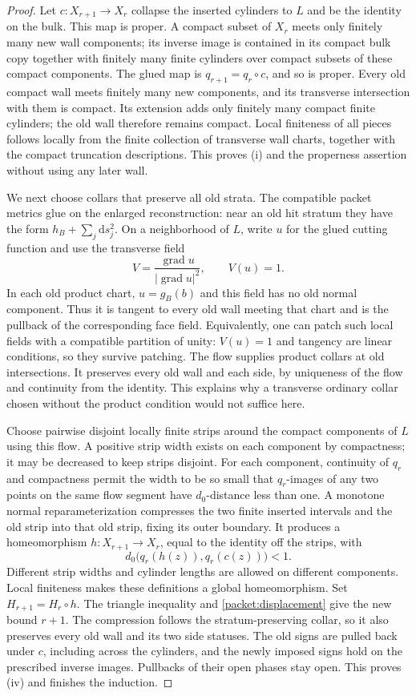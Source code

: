 \documentclass[11pt]{article}
\numberwithin{equation}{section}
\theoremstyle{definition}
\theoremstyle{remark}
\begin{document}
\begin{proof}
Let $c:X_{r+1}\to X_r$ collapse the inserted cylinders to $L$ and be
the identity on the bulk.  This map is proper.  A compact subset of
$X_r$ meets only finitely many new wall components; its inverse image
is contained in its compact bulk copy together with finitely many
finite cylinders over compact subsets of these compact components.
The glued map is $q_{r+1}=q_r\circ c$, and so is proper.
Every old compact wall meets finitely many new components, and its
transverse intersection with them is compact.  Its extension adds
only finitely many compact finite cylinders; the old wall therefore
remains compact.  Local finiteness of all pieces follows locally
from the finite collection of transverse wall charts, together with
the compact truncation descriptions.  This proves (i) and the
properness assertion without using any later wall.

We next choose collars that preserve all old strata.  The compatible
packet metrics glue on the enlarged reconstruction: near an old hit
stratum they have the form $h_B+\sum_j\mathrm d s_j^2$.  On a neighborhood
of $L$, write $u$ for the glued cutting function and use the transverse
field
\[
 V=\frac{\operatorname{grad} u}{|\operatorname{grad} u|^2},\qquad V(u)=1.
\]
In each old product chart, $u=g_B(b)$ and this field has no old normal
component.  Thus it is tangent to every old wall meeting that chart
and is the pullback of the corresponding face field.  Equivalently,
one can patch such local fields with a compatible partition of unity:
$V(u)=1$ and tangency are linear conditions, so they survive patching.
The flow supplies product collars at old intersections.  It preserves
every old wall and each side, by uniqueness of the flow and continuity
from the identity.  This explains why a transverse ordinary collar
chosen without the product condition would not suffice here.

Choose pairwise disjoint locally finite strips around the compact
components of $L$ using this flow.  A positive strip width exists on
each component by compactness; it may be decreased to keep strips
disjoint.  For each component, continuity of $q_r$ and compactness
permit the width to be so small that $q_r$-images of any two points
on the same flow segment have $d_0$-distance less than one.  A monotone normal
reparameterization compresses the two finite inserted intervals and
the old strip into that old strip, fixing its outer boundary.  It
produces a homeomorphism $h:X_{r+1}\to X_r$, equal to the identity
off the strips, with
\[
 d_0\bigl(q_r(h(z)),q_r(c(z))\bigr)<1.
\]
Different strip widths and cylinder lengths are allowed on different
components.  Local finiteness makes these definitions a global
homeomorphism.  Set $H_{r+1}=H_r\circ h$.  The triangle inequality
and \cref{packet:displacement} give the new bound $r+1$.
The compression follows the stratum-preserving collar, so it also
preserves every old wall and its two side statuses.  The old signs
are pulled back under $c$, including across the cylinders, and the
newly imposed signs hold on the prescribed inverse images.  Pullbacks
of their open phases stay open.  This
proves (iv) and finishes the induction.
\end{proof}
\end{document}
